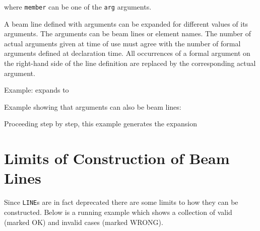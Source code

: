 where \texttt{member} can be one of the \texttt{arg} arguments.

A beam line defined with arguments can be expanded for different values
of its arguments.  
The arguments can be beam lines or element names. The number of actual
arguments given at time of use must agree with the number of formal
arguments defined at declaration time. All occurrences of a formal
argument on the right-hand side of the line definition are replaced by
the corresponding actual argument.  

Example:
expands to 

Example showing that arguments can also be beam lines:

Proceeding step by step, this example generates the expansion 


\section{Limits of Construction of Beam Lines}  

Since \texttt{LINE}s are in fact deprecated there are some limits to how
they can be constructed. Below is a running \madx example which shows a
collection of valid (marked OK) and invalid cases (marked WRONG).


